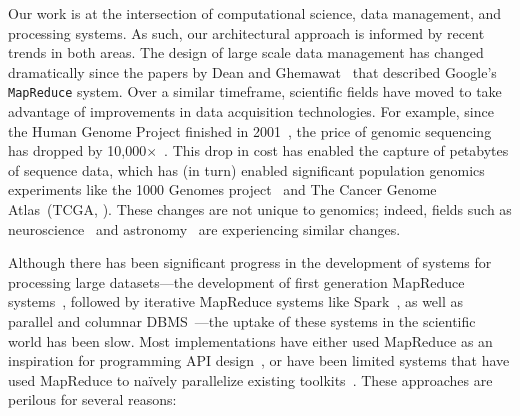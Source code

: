 \documentclass{acm_proc_article-sp}
\begin{document}
Our work is at the intersection of computational science, data management, and processing
systems. As such, our architectural approach is informed by recent trends in both areas. The design of
large scale data management has changed dramatically since the papers by Dean and
Ghemawat~\cite{dean04, dean08} that described Google's \texttt{MapReduce} system. Over a
similar timeframe, scientific fields have moved to take advantage of improvements in data acquisition
technologies. For example, since the Human Genome Project finished in 2001~\cite{lander01}, the price
of genomic sequencing has dropped by 10,000$\times$~\cite{nhgri}. This drop in cost has enabled the
capture of petabytes of sequence data, which has (in turn) enabled significant population genomics
experiments like the 1000 Genomes project~\cite{siva08} and The Cancer Genome Atlas~(TCGA,
\cite{weinstein13}). These changes are not unique to genomics; indeed, fields such as
neuroscience~\cite{cunningham14} and astronomy~\cite{lsst2008, turk11, sdss2000} are experiencing similar
changes.

Although there has been significant progress in the development of systems for processing large
datasets---the development of first generation MapReduce systems~\cite{dean04}, followed by
iterative MapReduce systems like Spark~\cite{zaharia10}, as well as parallel and columnar
DBMS~\cite{abadi06, lamb12}---the uptake of these systems in the scientific world has been slow.
Most implementations have either used MapReduce as an inspiration for programming API
design~\cite{mckenna10}, or have been limited systems that have used MapReduce to na\"{i}vely
parallelize existing toolkits~\cite{langmead09, schatz09}. These approaches are perilous for several
reasons:
\end{document}
